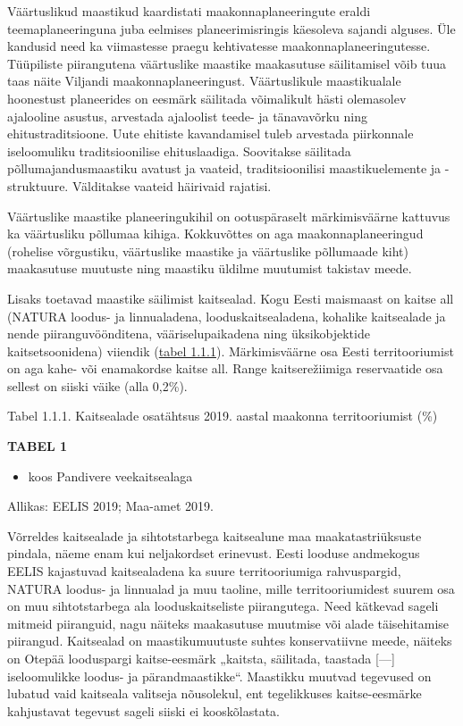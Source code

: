 \documentclass[estonian,]{article}
\providecommand{\tightlist}{%
  \setlength{\itemsep}{0pt}\setlength{\parskip}{0pt}}
\begin{document}
Väärtuslikud maastikud kaardistati maakonnaplaneeringute eraldi teemaplaneeringuna juba eelmises planeerimisringis käesoleva sajandi alguses. Üle kandusid need ka viimastesse praegu kehtivatesse maakonnaplaneeringutesse. Tüüpiliste piirangutena väärtuslike maastike maakasutuse säilitamisel võib tuua taas näite Viljandi maakonnaplaneeringust. Väärtuslikule maastikualale hoonestust planeerides on eesmärk säilitada võimalikult hästi olemasolev ajalooline asustus, arvestada ajaloolist teede- ja tänavavõrku ning ehitustraditsioone. Uute ehitiste kavandamisel tuleb arvestada piirkonnale iseloomuliku traditsioonilise ehituslaadiga. Soovitakse säilitada põllumajandusmaastiku avatust ja vaateid, traditsioonilisi maastikuelemente ja -struktuure. Välditakse vaateid häirivaid rajatisi.

Väärtuslike maastike planeeringukihil on ootuspäraselt märkimisväärne kattuvus ka väärtusliku põllumaa kihiga. Kokkuvõttes on aga maakonnaplaneeringud (rohelise võrgustiku, väärtuslike maastike ja väärtuslike põllumaade kiht) maakasutuse muutuste ning maastiku üldilme muutumist takistav meede.

Lisaks toetavad maastike säilimist kaitsealad. Kogu Eesti maismaast on kaitse all (NATURA loodus- ja linnualadena, looduskaitsealadena, kohalike kaitsealade ja nende piiranguvöönditena, vääriselupaikadena ning üksikobjektide kaitsetsoonidena) viiendik (\protect\hyperlink{table111}{tabel 1.1.1}). Märkimisväärne osa Eesti territooriumist on aga kahe- või enamakordse kaitse all. Range kaitserežiimiga reservaatide osa sellest on siiski väike (alla 0,2\%).

{Tabel 1.1.1.} Kaitsealade osatähtsus 2019. aastal maakonna territooriumist (\%)

\textbf{TABEL 1}

\begin{itemize}
\tightlist
\item
  koos Pandivere veekaitsealaga
\end{itemize}

\begin{imgsource}
{Allikas:} EELIS 2019; Maa-amet 2019.
\end{imgsource}

Võrreldes kaitsealade ja sihtotstarbega kaitsealune maa maakatastriüksuste pindala, näeme enam kui neljakordset erinevust. Eesti looduse andmekogus EELIS kajastuvad kaitsealadena ka suure territooriumiga rahvuspargid, NATURA loodus- ja linnualad ja muu taoline, mille territooriumidest suurem osa on muu sihtotstarbega ala looduskaitseliste piirangutega. Need kätkevad sageli mitmeid piiranguid, nagu näiteks maakasutuse muutmise või alade täisehitamise piirangud. Kaitsealad on maastikumuutuste suhtes konservatiivne meede, näiteks on Otepää looduspargi kaitse-eesmärk „kaitsta, säilitada, taastada {[}---{]} iseloomulikke loodus- ja pärandmaastikke``. Maastikku muutvad tegevused on lubatud vaid kaitseala valitseja nõusolekul, ent tegelikkuses kaitse-eesmärke kahjustavat tegevust sageli siiski ei kooskõlastata.
\end{document}
